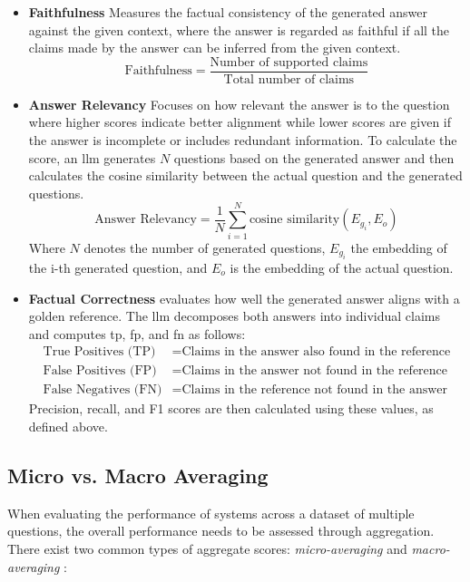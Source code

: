 \begin{itemize}
    \item \textbf{Faithfulness} Measures the factual consistency of the generated answer against the given context, where the answer is regarded as faithful if all the claims made by the answer can be inferred from the given context.
    \[
    \text{Faithfulness} = \frac{\text{Number of supported claims}}{\text{Total number of claims}}
    \]

    \item \textbf{Answer Relevancy} Focuses on how relevant the answer is to the question where higher scores indicate better alignment while lower scores are given if the answer is incomplete or includes redundant information. To calculate the score, an \gls{llm} generates $N$ questions based on the generated answer and then calculates the cosine similarity between the actual question and the generated questions.
    \[
    \text{Answer Relevancy} = \frac{1}{N}\sum^N_{i=1}\text{cosine similarity}(E_{g_i},E_o)
    \]
    Where $N$ denotes the number of generated questions, $E_{g_i}$ the embedding of the i-th generated question, and $E_o$ is the embedding of the actual question.

    \item \textbf{Factual Correctness} evaluates how well the generated answer aligns with a golden reference. The \gls{llm} decomposes both answers into individual claims and computes \gls{tp}, \gls{fp}, and \gls{fn} as follows:
    \[
    \begin{aligned}
    \text{True Positives (TP)} &= \text{Claims in the answer also found in the reference} \\
    \text{False Positives (FP)} &= \text{Claims in the answer not found in the reference} \\
    \text{False Negatives (FN)} &= \text{Claims in the reference not found in the answer}
    \end{aligned}
    \]
    Precision, recall, and F1 scores are then calculated using these values, as defined above.
\end{itemize}


\subsection{Micro vs. Macro Averaging}
When evaluating the performance of systems across a dataset of multiple questions, the overall performance needs to be assessed through aggregation. There exist two common types of aggregate scores: \emph{micro-averaging} and \emph{macro-averaging} \cite{hu_unveiling_2024}:

